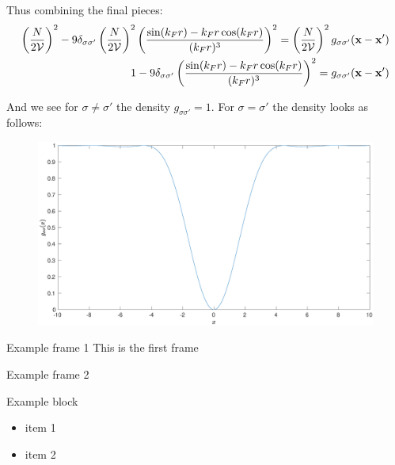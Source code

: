 \documentclass{beamer}
\begin{document}
\begin{frame}
Thus combining the final pieces:
\begin{align*}
\left(\frac{N}{2\mathcal{V}}\right)^2 -9\delta_{\sigma\sigma'}\left(\frac{N}{2\mathcal{V}}\right)^2 \left( \frac{\sin(k_Fr) - k_Fr \cos(k_Fr)}{(k_Fr)^3}\right)^2 = \left(\frac{N}{2\mathcal{V}}\right)^2 g_{\sigma\sigma'}(\textbf{x}-\textbf{x}') \\
1 -9\delta_{\sigma\sigma'} \left( \frac{\sin(k_Fr) - k_Fr \cos(k_Fr)}{(k_Fr)^3}\right)^2 =  g_{\sigma\sigma'}(\textbf{x}-\textbf{x}')
\end{align*}

And we see for $\sigma \neq \sigma'$ the density $g_{\sigma\sigma'}=1$.
For $\sigma = \sigma'$ the density looks as follows:

\begin{figure}[H]
\centering
\includegraphics[width=\textwidth]{Density}
\end{figure}
\end{frame}

\begin{frame}{Example frame 1}
This is the first frame
\end{frame}

\begin{frame}{Example frame 2}
\begin{block}{Example block}
\begin{itemize}
\item item 1
\item item 2
\end{itemize}
\end{block}
\end{frame}
\end{document}
